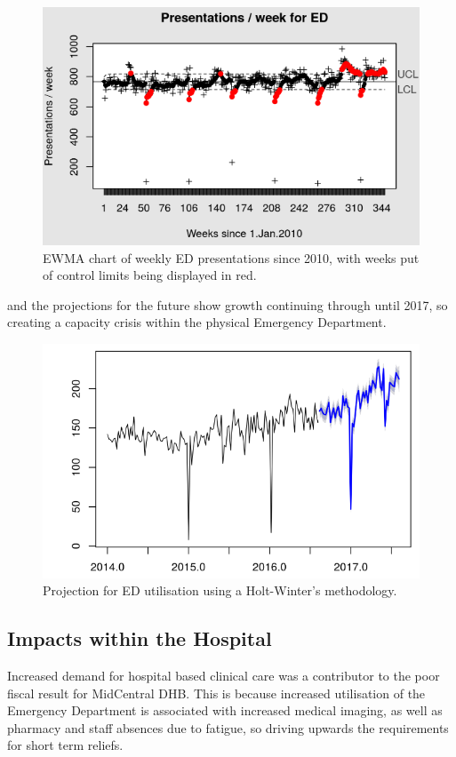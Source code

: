 \documentclass[11pt,a4paper]{article}
\begin{document}
\begin{figure}[htp]
\centering
\includegraphics[scale=0.70]{EWMA_ED_pesentations.png}
\caption{EWMA chart of weekly ED presentations since 2010, with weeks put of control limits being displayed in red.}
\label{EWMA statistical process chart of ED presentations}
\end{figure}


and the projections for the future show growth continuing through until 2017, so creating a capacity crisis within the physical Emergency Department.\\


\begin{figure}[htp]
\centering
\includegraphics[scale=0.70]{HW_projections.png}
\caption{Projection for ED utilisation using a Holt-Winter's methodology.}
\label{Projections for ED utilisation through to 2017}
\end{figure}


\subsection{Impacts within the Hospital}
Increased demand for hospital based clinical care was a contributor to the poor fiscal result for MidCentral DHB. This is because increased utilisation of the Emergency Department is associated with increased medical imaging, as well as pharmacy and staff absences due to fatigue, so driving upwards the requirements for short term reliefs.\\
\end{document}
